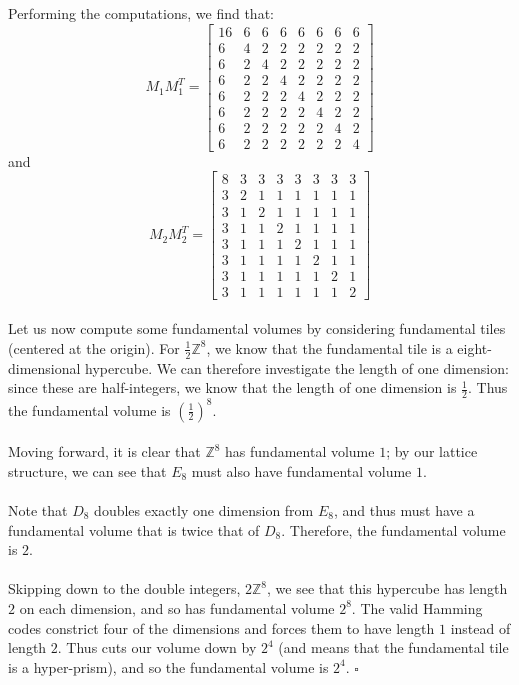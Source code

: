 \documentclass[letterpaper]{article}
\newcommand*{\QED}{\hfill\ensuremath{\square}}%
\begin{document}
Performing the computations, we find that:
\[
M_1 M_1^T =
\begin{bmatrix}
    16 & 6 & 6 & 6 & 6 & 6 & 6 & 6 \\
    6 & 4 & 2 & 2 & 2 & 2 & 2 & 2 \\
    6 & 2 & 4 & 2 & 2 & 2 & 2 & 2 \\
    6 & 2 & 2 & 4 & 2 & 2 & 2 & 2 \\
    6 & 2 & 2 & 2 & 4 & 2 & 2 & 2 \\
    6 & 2 & 2 & 2 & 2 & 4 & 2 & 2 \\
    6 & 2 & 2 & 2 & 2 & 2 & 4 & 2 \\
    6 & 2 & 2 & 2 & 2 & 2 & 2 & 4
\end{bmatrix}
\]
and
\[
M_2 M_2^T =
\begin{bmatrix}
    8 & 3 & 3 & 3 & 3 & 3 & 3 & 3 \\
    3 & 2 & 1 & 1 & 1 & 1 & 1 & 1 \\
    3 & 1 & 2 & 1 & 1 & 1 & 1 & 1 \\
    3 & 1 & 1 & 2 & 1 & 1 & 1 & 1 \\
    3 & 1 & 1 & 1 & 2 & 1 & 1 & 1 \\
    3 & 1 & 1 & 1 & 1 & 2 & 1 & 1 \\
    3 & 1 & 1 & 1 & 1 & 1 & 2 & 1 \\
    3 & 1 & 1 & 1 & 1 & 1 & 1 & 2
\end{bmatrix}
\]
\\
Let us now compute some fundamental volumes by considering fundamental tiles (centered at the origin).
For $ \frac{1}{2} \mathbb{Z}^8 $, we know that the fundamental tile is a eight-dimensional hypercube.
We can therefore investigate the length of one dimension:
since these are half-integers, we know that the length of one dimension is $ \frac{1}{2} $.
Thus the fundamental volume is $ {\left(\frac{1}{2} \right)}^8 $.
\\ \\
Moving forward, it is clear that $ \mathbb{Z}^8 $ has fundamental volume $ 1 $; by our lattice structure, we can see that $ E_8 $ must also have fundamental volume $ 1 $.
\\ \\
Note that $ D_8 $ doubles exactly one dimension from $ E_8 $, and thus must have a fundamental volume that is twice that of $ D_8 $.
Therefore, the fundamental volume is $ 2 $.
\\ \\
Skipping down to the double integers, $ 2 \mathbb{Z}^8 $, we see that this hypercube has length $ 2 $ on each dimension, and so has fundamental volume $ 2^8 $.
The valid Hamming codes constrict four of the dimensions and forces them to have length $ 1 $ instead of length $ 2 $.
Thus cuts our volume down by $ 2^4 $ (and means that the fundamental tile is a hyper-prism), and so the fundamental volume is $ 2^4 $.
\QED{}
\end{document}
